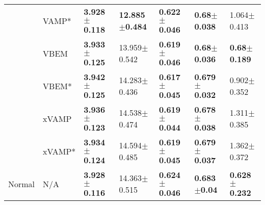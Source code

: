 \begin{tabular}{lllllll}
       & VAMP* &  \textbf{3.928$\pm$0.118} &  \textbf{12.885$\pm$0.484} &  \textbf{0.622$\pm$0.046} &   \textbf{0.68$\pm$0.038} &           1.064$\pm$0.413 \\
       & VBEM &  \textbf{3.933$\pm$0.125} &           13.959$\pm$0.542 &  \textbf{0.619$\pm$0.046} &   \textbf{0.68$\pm$0.036} &   \textbf{0.68$\pm$0.189} \\
       & VBEM* &  \textbf{3.942$\pm$0.125} &           14.283$\pm$0.436 &  \textbf{0.617$\pm$0.045} &  \textbf{0.679$\pm$0.032} &           0.902$\pm$0.352 \\
       & xVAMP &  \textbf{3.936$\pm$0.123} &           14.538$\pm$0.474 &  \textbf{0.619$\pm$0.044} &  \textbf{0.678$\pm$0.038} &           1.311$\pm$0.385 \\
       & xVAMP* &  \textbf{3.934$\pm$0.124} &           14.594$\pm$0.485 &  \textbf{0.619$\pm$0.045} &  \textbf{0.679$\pm$0.037} &           1.362$\pm$0.372 \\
Normal & N/A &  \textbf{3.928$\pm$0.116} &           14.363$\pm$0.515 &  \textbf{0.624$\pm$0.046} &   \textbf{0.683$\pm$0.04} &  \textbf{0.628$\pm$0.232} \\
\bottomrule
\end{tabular}

